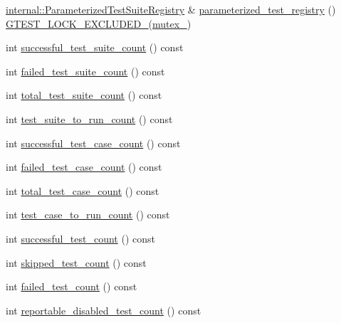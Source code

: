 \begin{DoxyCompactItemize}
\mbox{\hyperlink{classtesting_1_1internal_1_1_parameterized_test_suite_registry}{internal\+::\+Parameterized\+Test\+Suite\+Registry}} \& \mbox{\hyperlink{classtesting_1_1_unit_test_a3f72b753a9eda20bf7ab2aef0bdcc40f}{parameterized\+\_\+test\+\_\+registry}} () \mbox{\hyperlink{_obj__test_2lib_2googletest-release-1_88_81_2googletest_2include_2gtest_2internal_2gtest-port_8h_a69abff5a4efdd07bd5faebe3dd318d06}{G\+T\+E\+S\+T\+\_\+\+L\+O\+C\+K\+\_\+\+E\+X\+C\+L\+U\+D\+E\+D\+\_\+}}(\mbox{\hyperlink{classtesting_1_1_unit_test_abb94ef45cf0ab43be81ac6d5b1364132}{mutex\+\_\+}})
\item 
int \mbox{\hyperlink{classtesting_1_1_unit_test_aefa4c6654fed9a70c6c5ca61abae2234}{successful\+\_\+test\+\_\+suite\+\_\+count}} () const
\item 
int \mbox{\hyperlink{classtesting_1_1_unit_test_a118a74c8cc3845653893ed17245f44ac}{failed\+\_\+test\+\_\+suite\+\_\+count}} () const
\item 
int \mbox{\hyperlink{classtesting_1_1_unit_test_af8ed6d43a95405a860fdd898bf0c1a87}{total\+\_\+test\+\_\+suite\+\_\+count}} () const
\item 
int \mbox{\hyperlink{classtesting_1_1_unit_test_ade4726c8283513bd2b3391c600503790}{test\+\_\+suite\+\_\+to\+\_\+run\+\_\+count}} () const
\item 
int \mbox{\hyperlink{classtesting_1_1_unit_test_acaa2ab71f53c25ffe0242a91c14e173f}{successful\+\_\+test\+\_\+case\+\_\+count}} () const
\item 
int \mbox{\hyperlink{classtesting_1_1_unit_test_abc0fa297a4103f7cdd9627ae27d9d0ef}{failed\+\_\+test\+\_\+case\+\_\+count}} () const
\item 
int \mbox{\hyperlink{classtesting_1_1_unit_test_a93fc8f4eebc3212d06468ad216830ced}{total\+\_\+test\+\_\+case\+\_\+count}} () const
\item 
int \mbox{\hyperlink{classtesting_1_1_unit_test_a965248fbe72f9fede5de921b6666943b}{test\+\_\+case\+\_\+to\+\_\+run\+\_\+count}} () const
\item 
int \mbox{\hyperlink{classtesting_1_1_unit_test_a49ee8056e357ad497e67399447dd5a40}{successful\+\_\+test\+\_\+count}} () const
\item 
int \mbox{\hyperlink{classtesting_1_1_unit_test_a0082c74809be04baf7e43842ddac4ae5}{skipped\+\_\+test\+\_\+count}} () const
\item 
int \mbox{\hyperlink{classtesting_1_1_unit_test_ace1c860482b4ae5c341df5a9665e5c08}{failed\+\_\+test\+\_\+count}} () const
\item 
int \mbox{\hyperlink{classtesting_1_1_unit_test_a2a2835db178d5c8569507db9f0a3d54f}{reportable\+\_\+disabled\+\_\+test\+\_\+count}} () const

\end{DoxyCompactItemize}
